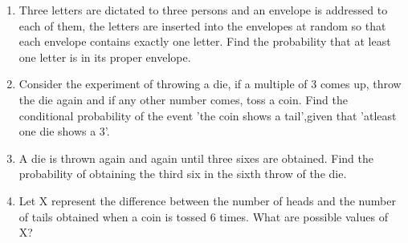 \begin{enumerate}[label=\thechapter.\arabic*,ref=\thechapter.\theenumi]
\item Three letters are dictated to three persons and an envelope is addressed to each
of them, the letters are inserted into the envelopes at random so that each envelope
contains exactly one letter. Find the probability that at least one letter is in its
proper envelope.
\item Consider the experiment of throwing a die, if a multiple of 3 comes up, throw the die again and if any other number comes, toss a coin. Find the conditional probability of the event 'the coin shows a tail',given that 'atleast one die shows a 3'.
\item A die is thrown again and again until three sixes are obtained. Find the probability of obtaining the third six in the sixth throw of the die.
\item Let X represent the difference between the number of heads and the number of
tails obtained when a coin is tossed 6 times. What are possible values of X?
\end{enumerate}
